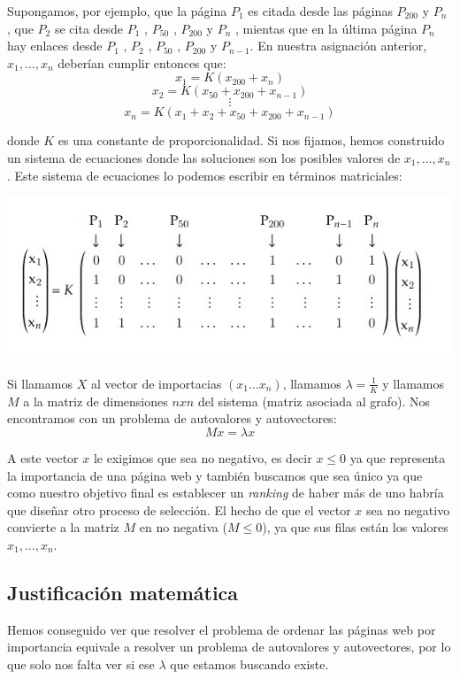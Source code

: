 \documentclass[size=a4, parskip=half, titlepage=false, toc=flat, toc=bib, 12pt]{scrartcl}
\theoremstyle{theorem-style}
\theoremstyle{definition-style}
\theoremstyle{remark-style}
\theoremstyle{example-style}
\theoremstyle{definition-style}
\theoremstyle{remark-style}
\begin{document}
Supongamos, por ejemplo, que la página $P_1$ es citada desde las páginas $P_{200}$ y $P_{n}$ ,
 que $P_2$ se cita desde $P_1$ , $P_{50}$ , $P_{200}$ y $P_n$ , mientas que en la última página $P_n$ hay enlaces desde $P_1$ , $P_2$ , $P_{50}$ , $P_{200}$ y $P_{n-1}$. En nuestra asignación anterior, $x_1, \dots , x_n$ deberían
 cumplir entonces que:
 $$ x_1 = K (x_{200} + x_n) $$
 $$ x_2 = K (x_{50} + x_{200} + x_{n-1}) $$
 $$ \vdots $$
 $$x_n = K (x_1 + x_2 + x_{50} + x_{200} + x_{n-1}) $$

donde $K$ es una constante de proporcionalidad. Si nos fijamos, hemos construido un sistema de ecuaciones
donde las soluciones son los posibles valores de $x_1, \dots , x_n$. Este sistema de ecuaciones
lo podemos escribir en términos matriciales:

\includegraphics[width=1.0\textwidth]{./img/matrizejemplo}

Si llamamos $X$ al vector de importacias $(x_1 \dots x_n)$, llamamos $\lambda = \frac{1}{K}$ y llamamos
$M$ a la matriz de dimensiones $n x n$ del sistema (matriz asociada al grafo). Nos encontramos
con un problema de autovalores y autovectores:
$$Mx = \lambda x $$

A este vector $x$ le exigimos que sea no negativo, es decir $x \leq 0$ ya que representa la importancia
de una página web y también buscamos que sea único ya que como nuestro objetivo final es establecer un
\textit{ranking} de haber más de uno habría que diseñar otro proceso de selección.
El hecho de que el vector $x$ sea no negativo convierte a la matriz $M$ en no negativa ($M \leq 0$), ya que sus filas
están los valores $x_1, \dots , x_n$.

\subsection{Justificación matemática}

Hemos conseguido ver que resolver el problema de ordenar las páginas web por importancia equivale a resolver un problema de autovalores y autovectores, por lo que solo nos falta ver si ese $\lambda$ que estamos buscando existe.
\end{document}
